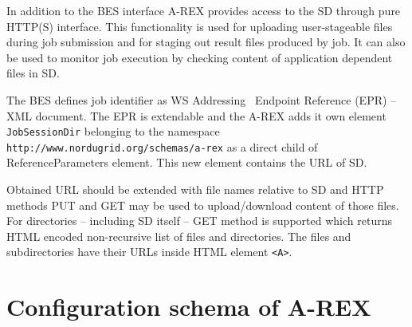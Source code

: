 \documentclass{article}                            %
\begin{document}
In addition to the BES interface A-REX provides access to the SD through
pure HTTP(S) interface. This functionality is used for uploading user-stageable
files during job submission and for staging out result files produced
by job. It can also be used to monitor job execution by checking content
of application dependent files in SD.

The BES defines job identifier as WS Addressing~\cite{ws-addr-soap}
Endpoint Reference (EPR) -- XML document. The EPR is extendable and 
the A-REX adds it own element \texttt{JobSessionDir} belonging to the namespace
\texttt{http://www.nordugrid.org/schemas/a-rex} as a direct child of ReferenceParameters
element. This new element contains the URL of SD.

Obtained URL should be extended with file names relative to SD and
HTTP methods PUT and GET may be used to upload/download content of
those files. For directories -- including SD itself -- GET method is
supported which returns HTML encoded non-recursive list of files and
directories. The files and subdirectories have their URLs inside HTML
element \verb|<A>|.


\section{Configuration schema of A-REX\label{annex:arex-conf}}
\end{document}
